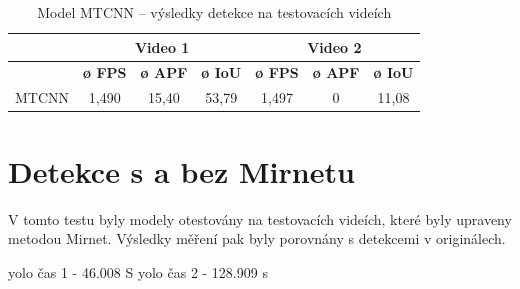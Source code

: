 \begin{table}[H]
  \centering
  \begin{tabular}{c|ccc|ccc|}
  \cline{2-7}
                                                               & \multicolumn{3}{c|}{\cellcolor[HTML]{CBCEFB}\textbf{Video 1}}                                                                              & \multicolumn{3}{c|}{\cellcolor[HTML]{CBCEFB}\textbf{Video 2}}                                                                              \\ \hline
  \rowcolor[HTML]{E0DBDB} 
  \multicolumn{1}{|c|}{\cellcolor[HTML]{E0DBDB}\textbf{Model}} & \multicolumn{1}{c|}{\cellcolor[HTML]{E0DBDB}\textbf{ø FPS}} & \multicolumn{1}{c|}{\cellcolor[HTML]{E0DBDB}\textbf{ø APF}} & \textbf{ø IoU} & \multicolumn{1}{c|}{\cellcolor[HTML]{E0DBDB}\textbf{ø FPS}} & \multicolumn{1}{c|}{\cellcolor[HTML]{E0DBDB}\textbf{ø APF}} & \textbf{ø IoU} \\ \hline
  \multicolumn{1}{|c|}{\cellcolor[HTML]{E0DBDB}MTCNN}          & \multicolumn{1}{c|}{1,490}                                  & \multicolumn{1}{c|}{15,40}                                  & 53,79          & \multicolumn{1}{c|}{1,497}                                  & \multicolumn{1}{c|}{0}                                      & 11,08          \\ \hline
  \end{tabular}
  \label{tabulka:mtcnnvidea}
  \caption{Model MTCNN -- výsledky detekce na testovacích videích}
\end{table}

\section{Detekce s a bez Mirnetu}
V tomto testu byly modely otestovány na testovacích videích, které byly upraveny metodou Mirnet. Výsledky měření pak byly porovnány s detekcemi v originálech. 

yolo čas 1 - 46.008 S
yolo čas 2 - 128.909 s

